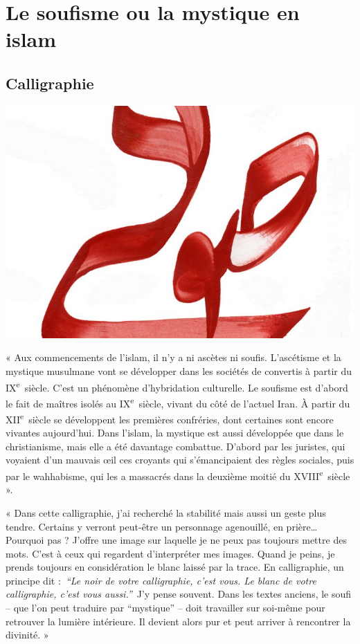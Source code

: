
\chapter{
Le soufisme ou la mystique en islam}


\section{Calligraphie}


\includegraphics[width=\textwidth]{Images/image013.jpg}


« Aux commencements de l'islam, il n'y a ni ascètes ni soufis.
L'ascétisme et la mystique musulmane vont se développer dans les
sociétés de convertis à partir du IX\textsuperscript{e}~siècle. C'est un
phénomène d'hybridation culturelle. Le soufisme est d'abord le fait de
maîtres isolés au IX\textsuperscript{e}~siècle, vivant du côté de
l'actuel Iran. À partir du XII\textsuperscript{e}~siècle se développent
les premières confréries, dont certaines sont encore vivantes
aujourd'hui. Dans l'islam, la mystique est aussi développée que dans le
christianisme, mais elle a été davantage combattue. D'abord par les
juristes, qui voyaient d'un mauvais œil ces croyants qui s'émancipaient
des règles sociales, puis par le wahhabisme, qui les a massacrés dans la
deuxième­ moitié du XVIII\textsuperscript{e}~siècle ».


« Dans cette calligraphie, j'ai recherché la stabilité mais aussi un
geste plus tendre. Certains y verront peut-être un personnage
agenouillé, en prière\ldots{} Pourquoi pas ? J'offre une image sur
laquelle je ne peux pas toujours mettre des mots. C'est à ceux qui
regardent d'interpréter mes images. Quand je peins, je prends toujours
en considération le blanc laissé par la trace. En calligraphie, un
principe dit :\emph{~``Le noir de votre calligraphie, c'est vous. Le
blanc de votre calligraphie, c'est vous aussi.''}~J'y pense souvent.
Dans les textes anciens, le soufi -- que l'on peut traduire par
``mystique'' -- doit travailler sur soi-même pour retrouver la lumière
intérieure. Il devient alors pur et peut arriver à rencontrer la
divinité. »
